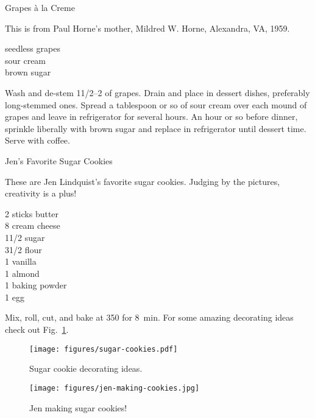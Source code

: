 \begin{entry}{Grapes \`{a} la Creme}

\begin{open}
    This is from Paul Horne's mother, Mildred W. Horne, Alexandra, VA, 1959.
\end{open}
\begin{ingredients}
    seedless grapes\\
    sour cream\\
    brown sugar
\end{ingredients}
Wash and de-stem 1\SIrange{1/2}{2}{\pound} of grapes. Drain and place in dessert
dishes, preferably long-stemmed ones.  Spread a tablespoon or so of sour cream
over each mound of grapes and leave in refrigerator for several hours.  An hour
or so before dinner, sprinkle liberally with brown sugar and replace in
refrigerator until dessert time.  Serve with coffee.
\end{entry}

\begin{entry}{Jen's Favorite Sugar Cookies}

\begin{open}
  These are Jen Lindquist's favorite sugar cookies.  Judging by the pictures,
  creativity is a plus!
\end{open}
\begin{ingredients}
    2 sticks butter\\
    \SI{8}{\ounce} cream cheese\\
    1\SI{1/2}{\cup} sugar\\
    3\SI{1/2}{\cup} flour\\
    \SI{1}{\teaspoon} vanilla\\
    \SI{1}{\teaspoon} almond\\
    \SI{1}{\teaspoon} baking powder\\
    1 egg
\end{ingredients}
Mix, roll, cut, and bake at \SI{350}{\degreeF} for \SI{8}{\minute}.  For some
amazing decorating ideas check out Fig.~\ref{fig:sugar-cookie-decorating}.
\begin{figure}
    \centering
    \texttt{[image: figures/sugar-cookies.pdf]}
    \caption{Sugar cookie decorating ideas.}
    \label{fig:sugar-cookie-decorating}
\end{figure}
\begin{figure}[b]
    \centering
    \texttt{[image: figures/jen-making-cookies.jpg]}
    \caption{Jen making sugar cookies!}
\end{figure}
\end{entry}

